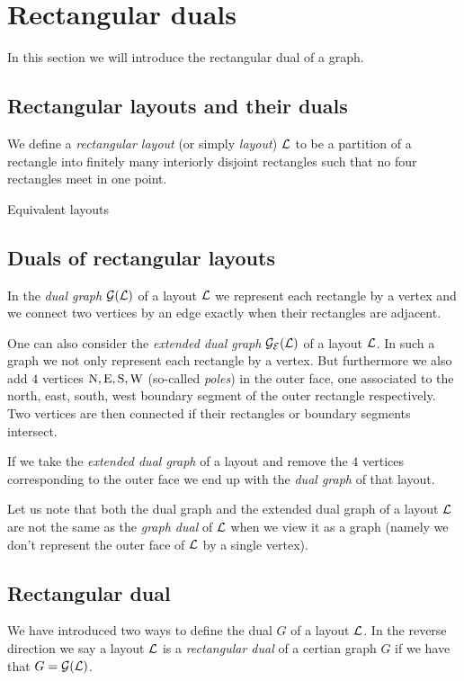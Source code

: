 
\section{Rectangular duals}
\newcommand{\G}{\scr G}
\renewcommand{\L}{\scr L}

In this section we will introduce the rectangular dual of a graph.

\subsection{Rectangular layouts and their duals}
  We define a \emph{rectangular layout} (or simply \emph{layout}) $\L$ to be a partition of a rectangle into finitely many interiorly disjoint rectangles such that no four rectangles meet in one point.

  Equivalent layouts 


\subsection{Duals of rectangular layouts}
  In the \emph{dual graph} $\dualgraph{\L}$ of a layout $\L$ we represent each rectangle by a vertex and we connect two vertices by an edge exactly when their rectangles are adjacent.

  One can also consider the \emph{extended dual graph} $\extdualgraph{\L}$ of a layout $\L$. In such a graph we not only represent each rectangle by a vertex. But furthermore we also add $4$ vertices $\mathrm{N}, \mathrm{E}, \mathrm{S}, \mathrm{W}$ (so-called \emph{poles}) in the outer face, one associated to the north, east, south, west boundary segment of the outer rectangle respectively. Two vertices are then connected if their rectangles or boundary segments intersect.

  If we take the \emph{extended dual graph} of a layout and remove the $4$ vertices corresponding to the outer face we end up with the \emph{dual graph} of that layout.

  Let us note that both the dual graph and the extended dual graph of a layout $\L$ are not the same as the \emph{graph dual} of $\L$ when we view it as a graph (namely we don't represent the outer face of $\L$ by a single vertex).

\subsection{Rectangular dual}
  We have introduced two ways to define the dual $G$ of a layout $\L$. In the reverse direction we say a layout $\L$ is a \emph{rectangular dual} of a certian graph $G$ if we have that $G = \dualgraph{\L}$.

